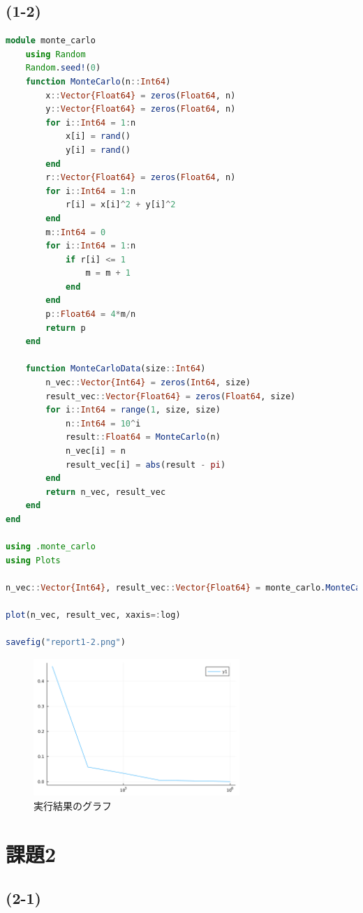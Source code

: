 \documentclass[uplatex, dvipdfmx, a4j,11pt]{jsarticle}
\begin{document}
\newpage
\subsection*{(1-2)}
\begin{lstlisting}[title={(1-2)のソースコード}, label=code:in, language=Julia]
module monte_carlo
    using Random
    Random.seed!(0)
    function MonteCarlo(n::Int64)
        x::Vector{Float64} = zeros(Float64, n)
        y::Vector{Float64} = zeros(Float64, n)
        for i::Int64 = 1:n
            x[i] = rand()
            y[i] = rand()
        end
        r::Vector{Float64} = zeros(Float64, n)
        for i::Int64 = 1:n
            r[i] = x[i]^2 + y[i]^2
        end
        m::Int64 = 0
        for i::Int64 = 1:n
            if r[i] <= 1
                m = m + 1
            end
        end
        p::Float64 = 4*m/n
        return p
    end

    function MonteCarloData(size::Int64)
        n_vec::Vector{Int64} = zeros(Int64, size)
        result_vec::Vector{Float64} = zeros(Float64, size)
        for i::Int64 = range(1, size, size)
            n::Int64 = 10^i
            result::Float64 = MonteCarlo(n)
            n_vec[i] = n
            result_vec[i] = abs(result - pi)
        end
        return n_vec, result_vec
    end
end

using .monte_carlo
using Plots

n_vec::Vector{Int64}, result_vec::Vector{Float64} = monte_carlo.MonteCarloData(6)

plot(n_vec, result_vec, xaxis=:log)

savefig("report1-2.png")

\end{lstlisting}

\begin{figure}[h]
  \begin{center}
    \includegraphics[width=78mm]{report1-2.png}
    \caption{実行結果のグラフ}
  \end{center}
\end{figure}

\section*{課題2}
\subsection*{(2-1)}
\end{document}
